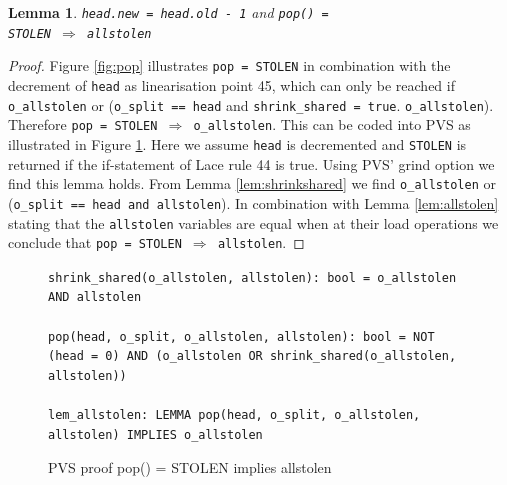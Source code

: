\documentclass{sig-alternate-br}
\newtheorem{lemma}{Lemma}
\begin{document}
\begin{lemma}
	\texttt{head.new = head.old - 1} and \texttt{pop() =\\ STOLEN $\Rightarrow$ \texttt{allstolen}}
	\label{lem:popstolen}
\end{lemma}
\begin{proof}
	Figure \ref{fig:pop} illustrates \texttt{pop = STOLEN} in combination with the decrement of \texttt{head} as linearisation point 45, which can only be reached if \texttt{o\_allstolen} or (\texttt{o\_split == head} and \texttt{shrink\_shared = true}.
	\texttt{o\_allstolen}). Therefore \texttt{pop = STOLEN $\Rightarrow$ o\_allstolen}. This can be coded into PVS as illustrated in Figure \ref{pvs:popallstolen}. Here we assume \texttt{head} is decremented and \texttt{STOLEN} is returned if the if-statement of Lace rule 44 is true. Using PVS' grind option we find this lemma holds. From Lemma \ref{lem:shrinkshared} we find \texttt{o\_allstolen} or (\texttt{o\_split == head and allstolen}).
	In combination with Lemma \ref{lem:allstolen} stating that the \texttt{allstolen} variables are equal when at their load operations we conclude that \texttt{pop = STOLEN $\Rightarrow$ allstolen}.
\end{proof}
\begin{figure}[h]
	\texttt{shrink\_shared(o\_allstolen, allstolen): bool = o\_allstolen AND allstolen}\\\\
	\texttt{pop(head, o\_split, o\_allstolen, allstolen): bool = NOT (head = 0) AND (o\_allstolen OR shrink\_shared(o\_allstolen, allstolen))}\\\\
	\texttt{lem\_allstolen: LEMMA pop(head, o\_split, o\_allstolen, allstolen) IMPLIES o\_allstolen}
	\caption{PVS proof pop() = STOLEN implies allstolen}
	\label{pvs:popallstolen}
\end{figure}
\end{document}
